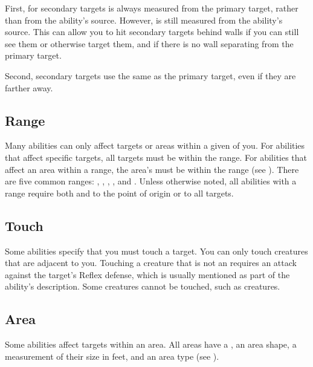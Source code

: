             First,  for secondary targets is always measured from the primary target, rather than from the ability's source.
            However,  is still measured from the ability's source.
            This can allow you to hit secondary targets behind walls if you can still see them or otherwise target them, and if there is no wall separating from the primary target.

            Second, secondary targets use the same  as the primary target, even if they are farther away.
            
    \subsection{Range}\label{Range}
        Many abilities can only affect targets or areas within a given  of you.
        For abilities that affect specific targets, all targets must be within the range.
        For abilities that affect an area within a range, the area's  must be within the range (see ).
        There are five common ranges: \shortrange, \medrange, \longrange, \distrange, and \extrange.
        Unless otherwise noted, all abilities with a range require both  and  to the point of origin or to all targets.

    \subsection{Touch}\label{Touch}
        Some abilities specify that you must touch a target.
        You can only touch creatures that are adjacent to you.
        Touching a creature that is not an  requires an attack against the target's Reflex defense, which is usually mentioned as part of the ability's description.
        Some creatures cannot be touched, such as  creatures.

    \subsection{Area}\label{Area}

        Some abilities affect targets within an area.
        All areas have a , an area shape, a measurement of their size in feet, and an area type (see ).

